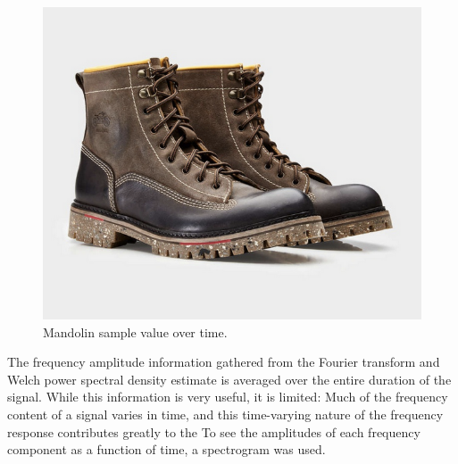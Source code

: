 \documentclass{article}
\begin{document}
        \begin{figure}[h]
            \includegraphics[scale=0.25]{images/placeholder.png}%
            \centering
            \caption{Mandolin sample value over time.}
            \label{welchMando}
        \end{figure}
        The frequency amplitude information gathered from the Fourier transform and Welch power spectral density estimate is averaged over the entire duration of the signal.
        While this information is very useful, it is limited: Much of the frequency content of a signal varies in time, and this time-varying nature of the frequency response contributes greatly to the 
        To see the amplitudes of each frequency component as a function of time, a spectrogram was used.
\end{document}

